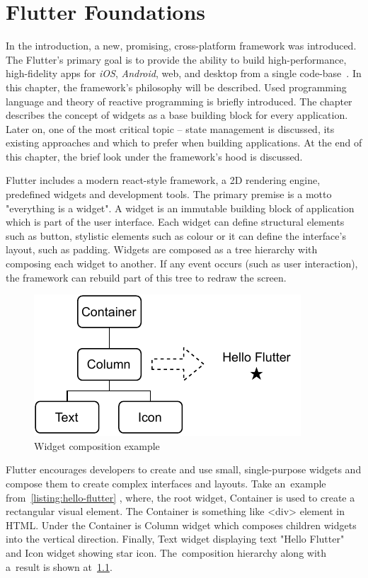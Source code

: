\chapter{Flutter Foundations}
\label{ch:flutter}
In the introduction, a new, promising, cross-platform framework was introduced. The Flutter's primary goal is to provide the ability to build high-performance, high-fidelity apps for \textit{iOS}, \textit{Android}, web, and desktop from a single code-base~\cite{flutter-technical-overview}. In this chapter, the framework's philosophy will be described. Used programming language and theory of reactive programming is briefly introduced. The chapter describes the concept of widgets as a base building block for every application. Later on, one of the most critical topic -- state management is discussed, its existing approaches and which to prefer when building applications. At the end of this chapter, the brief look under the framework's hood is discussed.

Flutter includes a modern react-style framework, a 2D rendering engine, predefined widgets and development tools. The primary premise is a motto "everything is a widget". A widget is an immutable building block of application which is part of the user interface. Each widget can define structural elements such as button, stylistic elements such as colour or it can define the interface's layout, such as padding. Widgets are composed as a tree hierarchy with composing each widget to another. If any event occurs (such as user interaction), the framework can rebuild part of this tree to redraw the screen.  

\begin{figure}[htp]
    \centering
    \includegraphics[width=0.5\linewidth]{img/flutter/hello-flutter.pdf}
    \caption{Widget composition example}
    \label{fig:hello-flutter}
\end{figure}

Flutter encourages developers to create and use small, single-purpose widgets and compose them to create complex interfaces and layouts. Take an~example from~\cref{listing:hello-flutter} , where, the root widget, Container is used to create a rectangular visual element. The Container is something like <div> element in HTML.  Under the Container is Column widget which composes children widgets into the vertical direction. Finally, Text widget displaying text "Hello Flutter" and Icon widget showing star icon. The~composition hierarchy along with a~result is shown at~\cref{fig:hello-flutter}.

